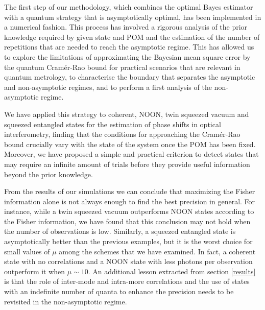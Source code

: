The first step of our methodology, which combines the optimal Bayes estimator with a quantum strategy that is asymptotically optimal, has been implemented in a numerical fashion. This process has involved a rigorous analysis of the prior knowledge required by given state and POM and the estimation of the number of repetitions that are needed to reach the asymptotic regime. This has allowed us to explore the limitations of approximating the Bayesian mean square error by the quantum Cram\'{e}r-Rao bound for practical scenarios that are relevant in quantum metrology, to characterise the boundary that separates the asymptotic and non-asymptotic regimes, and to perform a first analysis of the non-asymptotic regime. 
 
We have applied this strategy to coherent, NOON, twin squeezed vacuum and squeezed entangled states for the estimation of phase shifts in optical interferometry, finding that the conditions for approaching the Cram\'{e}r-Rao bound crucially vary with the state of the system once the POM has been fixed. Moreover, we have proposed a simple and practical criterion to detect states that may require an infinite amount of trials before they provide useful information beyond the prior knowledge.

From the results of our simulations we can conclude that maximizing the Fisher information alone is not always enough to find the best precision in general. For instance, while a twin squeezed vacuum outperforms NOON states according to the Fisher information, we have found that this conclusion may not hold when the number of observations is low. Similarly, a squeezed entangled state is asymptotically better than the previous examples, but it is the worst choice for small values of $\mu$ among the schemes that we have examined. In fact, a coherent state with no correlations and a NOON state with less photons per observation outperform it when $\mu \sim 10$. An additional lesson extracted from section \ref{results} is that the role of inter-mode and intra-more correlations and the use of states with an indefinite number of quanta to enhance the precision needs to be revisited in the non-asymptotic regime.


